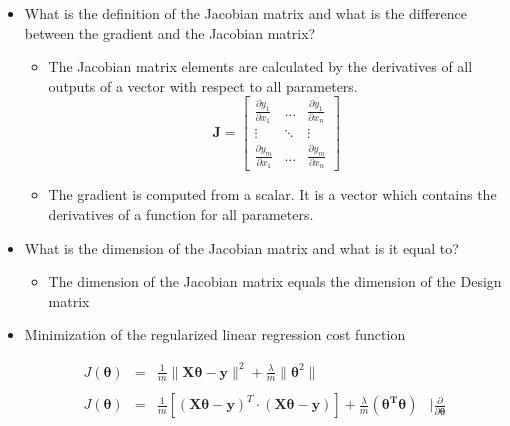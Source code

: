 \documentclass{article}
\begin{document}
\begin{itemize}
    \item What is the definition of the Jacobian matrix and what is the difference between the gradient and the Jacobian matrix?
    
    \begin{itemize}
        \item The Jacobian matrix elements are calculated by the derivatives of all outputs of a vector with respect to all parameters.  \\
            $$ \boldsymbol{J} = 
            \begin{bmatrix}
            	\frac{\partial y_1}{\partial x_1}	&	\dots	&	\frac{\partial y_1}{\partial x_n} 	\\
            	\vdots								&	\ddots	&	\vdots								\\
            	\frac{\partial y_m}{\partial x_1	}	&	\dots	&	\frac{\partial y_m}{\partial x_n}
            \end{bmatrix} $$
            
        \item The gradient is computed from a scalar. It is a vector which contains the derivatives of a function for all parameters.              
    \end{itemize}
    
    \item What is the dimension of the Jacobian matrix and what is it equal to?
    
    \begin{itemize}
    
        \item The dimension of the Jacobian matrix equals the dimension of the Design matrix
    
    \end{itemize}
    
    \item Minimization of the regularized linear regression cost function
    
    $$\begin{array}{rclr}
        J(\boldsymbol{\theta}) & = & \frac{1}{m} \| \boldsymbol{X\theta - y} \|^2 + \frac{\lambda}{m} \| \boldsymbol{\theta}^2 \| & \\\\
        J(\boldsymbol{\theta}) & = & \frac{1}{m} \left[(\boldsymbol{X\theta - y})^T \cdot (\boldsymbol{X\theta - y}) \right] + \frac{\lambda}{m} (\boldsymbol{\theta^T \theta}) & \mid \frac{\partial}{\partial\boldsymbol{\theta}} \\
    \end{array}$$
    

\end{itemize}
\end{document}
